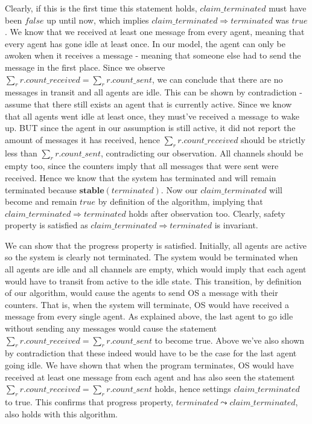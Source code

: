 \documentclass[10pt,letter]{article}
\begin{document}
Clearly, if this is the first time this statement holds, $claim\_terminated$ must have been $false$ up until now, which implies $claim\_terminated \Rightarrow terminated$ was $true$. We know that we received at least one message from every agent, meaning that every agent has gone idle at least once. In our model, the agent can only be awoken when it receives a message - meaning that someone else had to send the message in the first place. Since we observe $\sum\limits_{r} r.count\_received = \sum\limits_{r} r.count\_sent$, we can conclude that there are no messages in transit and all agents are idle. This can be shown by contradiction - assume that there still exists an agent that is currently active. Since we know that all agents went idle at least once, they must've received a message to wake up. BUT since the agent in our assumption is still active, it did not report the amount of messages it has received, hence $\sum\limits_{r} r.count\_received$ should be strictly less than $\sum\limits_{r} r.count\_sent$, contradicting our observation. All channels should be empty too, since the counters imply that all messages that were sent were received. Hence we know that the system has terminated and will remain terminated because $\textbf{stable}(terminated)$. Now our $claim\_terminated$ will become and remain $true$ by definition of the algorithm, implying that $claim\_terminated \Rightarrow terminated$ holds after observation too. Clearly, safety property is satisfied as $claim\_terminated \Rightarrow terminated$ is invariant.

We can show that the progress property is satisfied. Initially, all agents are active so the system is clearly not terminated. The system would be terminated when all agents are idle and all channels are empty, which would imply that each agent would have to transit from active to the idle state. This transition, by definition of our algorithm, would cause the agents to send OS a message with their counters. That is, when the system will terminate, OS would have received a message from every single agent. As explained above, the last agent to go idle without sending any messages would cause the statement $\sum\limits_{r} r.count\_received = \sum\limits_{r} r.count\_sent$ to become true. Above we've also shown by contradiction that these indeed would have to be the case for the last agent going idle. We have shown that when the program terminates, OS would have received at least one message from each agent and has also seen the statement $\sum\limits_{r} r.count\_received = \sum\limits_{r} r.count\_sent$ holds, hence settings $claim\_terminated$ to true. This confirms that progress property, $terminated \leadsto claim\_terminated$, also holds with this algorithm.
\end{document}

